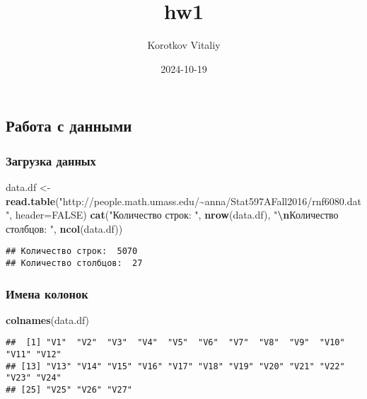 \documentclass[
]{article}
\title{hw1}
\author{Korotkov Vitaliy}
\date{2024-10-19}
\newenvironment{Shaded}{\begin{snugshade}}{\end{snugshade}}
\newcommand{\AttributeTok}[1]{\textcolor[rgb]{0.13,0.29,0.53}{#1}}
\newcommand{\ConstantTok}[1]{\textcolor[rgb]{0.56,0.35,0.01}{#1}}
\newcommand{\FunctionTok}[1]{\textcolor[rgb]{0.13,0.29,0.53}{\textbf{#1}}}
\newcommand{\NormalTok}[1]{#1}
\newcommand{\OtherTok}[1]{\textcolor[rgb]{0.56,0.35,0.01}{#1}}
\newcommand{\SpecialCharTok}[1]{\textcolor[rgb]{0.81,0.36,0.00}{\textbf{#1}}}
\newcommand{\StringTok}[1]{\textcolor[rgb]{0.31,0.60,0.02}{#1}}
\begin{document}
\maketitle

\subsection{Работа с
данными}\label{ux440ux430ux431ux43eux442ux430-ux441-ux434ux430ux43dux43dux44bux43cux438}

\subsubsection{Загрузка
данных}\label{ux437ux430ux433ux440ux443ux437ux43aux430-ux434ux430ux43dux43dux44bux445}

\begin{Shaded}
\begin{Highlighting}[]
\NormalTok{data.df }\OtherTok{\textless{}{-}} \FunctionTok{read.table}\NormalTok{(}\StringTok{"http://people.math.umass.edu/\textasciitilde{}anna/Stat597AFall2016/rnf6080.dat"}\NormalTok{, }\AttributeTok{header=}\ConstantTok{FALSE}\NormalTok{)}
\FunctionTok{cat}\NormalTok{(}\StringTok{"Количество строк: "}\NormalTok{, }\FunctionTok{nrow}\NormalTok{(data.df), }\StringTok{"}\SpecialCharTok{\textbackslash{}n}\StringTok{Количество столбцов: "}\NormalTok{, }\FunctionTok{ncol}\NormalTok{(data.df))}
\end{Highlighting}
\end{Shaded}

\begin{verbatim}
## Количество строк:  5070 
## Количество столбцов:  27
\end{verbatim}

\subsubsection{Имена
колонок}\label{ux438ux43cux435ux43dux430-ux43aux43eux43bux43eux43dux43eux43a}

\begin{Shaded}
\begin{Highlighting}[]
\FunctionTok{colnames}\NormalTok{(data.df)}
\end{Highlighting}
\end{Shaded}

\begin{verbatim}
##  [1] "V1"  "V2"  "V3"  "V4"  "V5"  "V6"  "V7"  "V8"  "V9"  "V10" "V11" "V12"
## [13] "V13" "V14" "V15" "V16" "V17" "V18" "V19" "V20" "V21" "V22" "V23" "V24"
## [25] "V25" "V26" "V27"
\end{verbatim}
\end{document}
